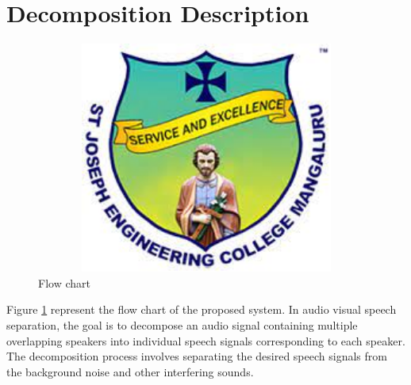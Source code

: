 \documentclass[12pt,a4paper]{report}
\begin{document}
\section{Decomposition Description}
\begin{figure}[hbtp]
\centering
\includegraphics[width=5in,height=3in]{./pic/sjeclogo.png}
\caption{Flow chart}
\label{fig:pic2}
\end{figure}
\newpage
Figure \ref{fig:pic2} represent the flow chart of the proposed system. In audio visual speech separation, the goal is to decompose an audio signal containing multiple overlapping speakers into individual speech signals corresponding to each speaker. The decomposition process involves separating the desired speech signals from the background noise and other interfering sounds.
\end{document}
